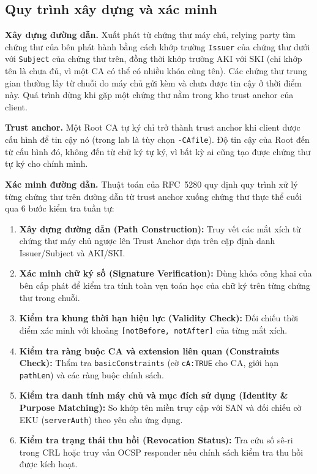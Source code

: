 \subsection{Quy trình xây dựng và xác minh}
\label{subsec:path-building-validation}

\noindent\textbf{Xây dựng đường dẫn.} Xuất phát từ chứng thư máy chủ, relying party tìm chứng thư của bên phát hành bằng cách khớp trường \texttt{Issuer} của chứng thư dưới với \texttt{Subject} của chứng thư trên, đồng thời khớp trường AKI với SKI (chỉ khớp tên là chưa đủ, vì một CA có thể có nhiều khóa cùng tên). Các chứng thư trung gian thường lấy từ chuỗi do máy chủ gửi kèm và chưa được tin cậy ở thời điểm này. Quá trình dừng khi gặp một chứng thư nằm trong kho trust anchor của client.

\noindent\textbf{Trust anchor.} Một Root CA tự ký chỉ trở thành trust anchor khi client được cấu hình để tin cậy nó (trong lab là tùy chọn \texttt{-CAfile}). Độ tin cậy của Root đến từ cấu hình đó, không đến từ chữ ký tự ký, vì bất kỳ ai cũng tạo được chứng thư tự ký cho chính mình.

\noindent\textbf{Xác minh đường dẫn.} Thuật toán của RFC~5280 quy định quy trình xử lý từng chứng thư trên đường dẫn từ trust anchor xuống chứng thư thực thể cuối qua 6 bước kiểm tra tuần tự:
\begin{enumerate}\setlength{\itemsep}{1pt}\setlength{\parskip}{0pt}
    \item \textbf{Xây dựng đường dẫn (Path Construction):} Truy vết các mắt xích từ chứng thư máy chủ ngược lên Trust Anchor dựa trên cặp định danh Issuer/Subject và AKI/SKI.
    \item \textbf{Xác minh chữ ký số (Signature Verification):} Dùng khóa công khai của bên cấp phát để kiểm tra tính toàn vẹn toán học của chữ ký trên từng chứng thư trong chuỗi.
    \item \textbf{Kiểm tra khung thời hạn hiệu lực (Validity Check):} Đối chiếu thời điểm xác minh với khoảng \texttt{[notBefore, notAfter]} của từng mắt xích.
    \item \textbf{Kiểm tra ràng buộc CA và extension liên quan (Constraints Check):} Thẩm tra \texttt{basicConstraints} (cờ \texttt{cA:TRUE} cho CA, giới hạn \texttt{pathLen}) và các ràng buộc chính sách.
    \item \textbf{Kiểm tra danh tính máy chủ và mục đích sử dụng (Identity \& Purpose Matching):} So khớp tên miền truy cập với SAN và đối chiếu cờ EKU (\texttt{serverAuth}) theo yêu cầu ứng dụng.
    \item \textbf{Kiểm tra trạng thái thu hồi (Revocation Status):} Tra cứu số sê-ri trong CRL hoặc truy vấn OCSP responder nếu chính sách kiểm tra thu hồi được kích hoạt.
\end{enumerate}

